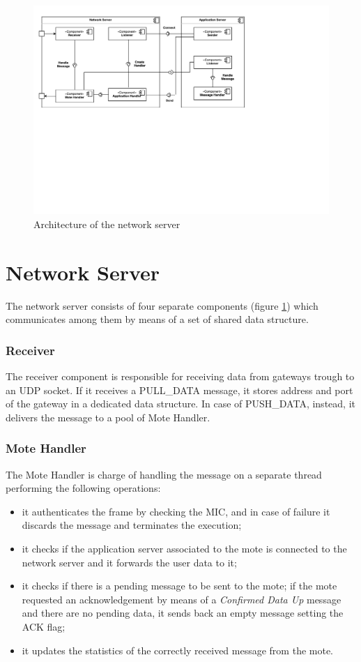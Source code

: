 \begin{figure}[]
\centering
\includegraphics[width=\textwidth]{img/netserver}
\caption{Architecture of the network server}
\label{fig:servercomponent}
\end{figure}

\section{Network Server}
The network server consists of four separate components (figure \ref{fig:servercomponent}) which communicates among them by means of a set of shared data structure.

\subsubsection{Receiver}
The receiver component is responsible for receiving data from gateways trough to an UDP socket. If it receives a PULL\_DATA message, it stores address and port of the gateway in a dedicated data structure. In case of PUSH\_DATA, instead, it delivers the message to a pool of Mote Handler.

\subsubsection{Mote Handler}
The Mote Handler is charge of handling the message on a separate thread performing the following operations:

\begin{itemize}
\item it authenticates the frame by checking the MIC, and in case of failure it discards the message and terminates the execution;
\item it checks if the application server associated to the mote is connected to the network server and it forwards the user data to it;
\item it checks if there is a pending message to be sent to the mote; if the mote requested an acknowledgement by means of a \emph{Confirmed Data Up} message and there are no pending data, it sends back an empty message setting the ACK flag;
\item it updates the statistics of the correctly received message from the mote.
\end{itemize}


